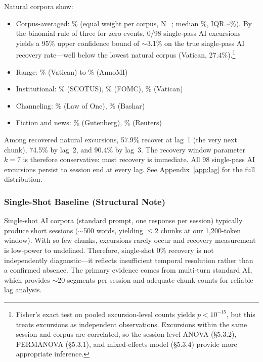 \documentclass[11pt]{article}
\begin{document}
Natural corpora show:
\begin{itemize}
\item Corpus-averaged: \recNatCorpusAvg\% (equal weight per corpus, N=\nNatural; median \recNatMedian\%, IQR \recNatIQRlo--\recNatIQRhi\%). By the binomial rule of three for zero events, 0/98 single-pass AI excursions yields a 95\% upper confidence bound of $\sim$3.1\% on the true single-pass AI recovery rate---well below the lowest natural corpus (Vatican, 27.4\%).\footnote{Fisher's exact test on pooled excursion-level counts yields $p < 10^{-15}$, but this treats excursions as independent observations. Excursions within the same session and corpus are correlated, so the session-level ANOVA (\S5.3.2), PERMANOVA (\S5.3.1), and mixed-effects model (\S5.3.4) provide more appropriate inference.}
\item Range: \recVatican\% (Vatican) to \recAnnoMI\% (AnnoMI)
\item Institutional: \recSCOTUS\% (SCOTUS), \recFOMC\% (FOMC), \recVatican\% (Vatican)
\item Channeling: \recLawOfOne\% (Law of One), \recBashar\% (Bashar)
\item Fiction and news: \recFiction\% (Gutenberg), \recNews\% (Reuters)
\end{itemize}

Among recovered natural excursions, 57.9\% recover at lag~1 (the very next chunk), 74.5\% by lag~2, and 90.4\% by lag~3. The recovery window parameter $k=7$ is therefore conservative: most recovery is immediate. All 98 single-pass AI excursions persist to session end at every lag. See Appendix~\ref{app:lag} for the full distribution.

\subsubsection{Single-Shot Baseline (Structural Note)}
\label{sec:singleshot}

Single-shot AI corpora (standard prompt, one response per session) typically produce short sessions ($\sim$500 words, yielding $\leq$2 chunks at our 1,200-token window). With so few chunks, excursions rarely occur and recovery measurement is low-power to undefined. Therefore, single-shot 0\% recovery is not independently diagnostic---it reflects insufficient temporal resolution rather than a confirmed absence. The primary evidence comes from multi-turn standard AI, which provides $\sim$20 segments per session and adequate chunk counts for reliable lag analysis.
\end{document}
